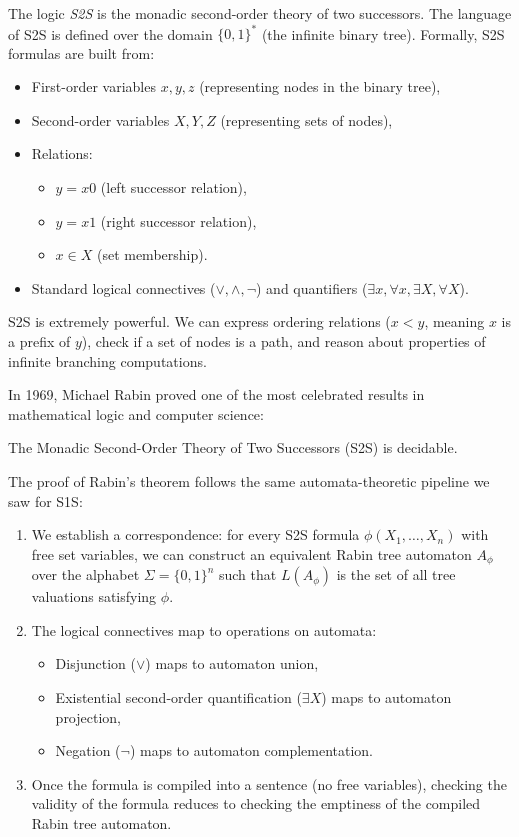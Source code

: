 \begin{definition}[S2S Logic]
The logic \emph{S2S} is the monadic second-order theory of two successors. The language of S2S is defined over the domain $\{0,1\}^*$ (the infinite binary tree). Formally, S2S formulas are built from:
\begin{itemize}
    \item First-order variables $x, y, z$ (representing nodes in the binary tree),
    \item Second-order variables $X, Y, Z$ (representing sets of nodes),
    \item Relations:
    \begin{itemize}
        \item $y = x0$ (left successor relation),
        \item $y = x1$ (right successor relation),
        \item $x \in X$ (set membership).
    \end{itemize}
    \item Standard logical connectives ($\lor, \land, \neg$) and quantifiers ($\exists x, \forall x, \exists X, \forall X$).
\end{itemize}
\end{definition}

S2S is extremely powerful. We can express ordering relations ($x < y$, meaning $x$ is a prefix of $y$), check if a set of nodes is a path, and reason about properties of infinite branching computations.

In 1969, Michael Rabin proved one of the most celebrated results in mathematical logic and computer science:

\begin{theorem}
The Monadic Second-Order Theory of Two Successors (S2S) is decidable.
\end{theorem}

The proof of Rabin's theorem follows the same automata-theoretic pipeline we saw for S1S:
\begin{enumerate}
    \item We establish a correspondence: for every S2S formula $\phi(X_1, \dots, X_n)$ with free set variables, we can construct an equivalent Rabin tree automaton $A_\phi$ over the alphabet $\Sigma = \{0,1\}^n$ such that $L(A_\phi)$ is the set of all tree valuations satisfying $\phi$.
    \item The logical connectives map to operations on automata:
    \begin{itemize}
        \item Disjunction ($\lor$) maps to automaton union,
        \item Existential second-order quantification ($\exists X$) maps to automaton projection,
        \item Negation ($\neg$) maps to automaton complementation.
    \end{itemize}
    \item Once the formula is compiled into a sentence (no free variables), checking the validity of the formula reduces to checking the emptiness of the compiled Rabin tree automaton.
\end{enumerate}

